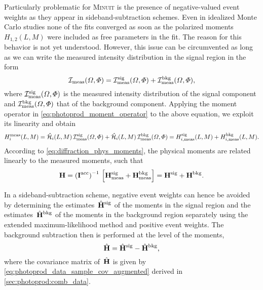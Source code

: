 Particularly problematic for \textsc{Minuit} is the presence of
negative-valued event weights as they appear in sideband-subtraction
schemes.  Even in idealized Monte Carlo studies none of the fits
converged as soon as the polarized moments $H_{1,2}(L, M)$ were
included as free parameters in the fit.  The reason for this behavior
is not yet understood.  However, this issue can be circumvented as
long as we can write the measured intensity distribution in the signal
region in the form
\begin{equation}
  \mathcal{I}_\text{meas}(\Omega, \Phi)
  = \mathcal{I}_\text{meas}^\text{sig}(\Omega, \Phi) + \mathcal{I}_\text{meas}^\text{bkg}(\Omega, \Phi),
\end{equation}
where $\mathcal{I}_\text{meas}^\text{sig}(\Omega, \Phi)$ is the
measured intensity distribution of the signal component and
$\mathcal{I}_\text{meas}^\text{bkg}(\Omega, \Phi)$ that of the
background component.  Applying the moment operator in
\cref{eq:photoprod_moment_operator} to the above equation, we exploit
its linearity and obtain
\begin{equation}
  H_i^\text{meas}(L, M)
  = \hat{\mathcal{H}}_i(L, M)\, \mathcal{I}_\text{meas}^\text{sig}(\Omega, \Phi)
  + \hat{\mathcal{H}}_i(L, M)\, \mathcal{I}_\text{meas}^\text{bkg}(\Omega, \Phi)
  = H_{i, \text{meas}}^\text{sig}(L, M) + H_{i, \text{meas}}^\text{bkg}(L, M).
\end{equation}
According to \cref{eq:diffraction_phys_moments}, the physical moments
are related linearly to the measured moments, such that
\begin{equation}
  \vect{H }
  = \rBrk[0]{\mat{I}^\text{acc}}^{-1}\, \sBrk{\vect{H}_\text{meas}^\text{sig} + \vect{H}_\text{meas}^\text{bkg}}
  = \vect{H}^\text{sig} + \vect{H}^\text{bkg}.
\end{equation}

In a sideband-subtraction scheme, negative event weights can hence be
avoided by determining the estimates~$\hat{\bm{\mathrm{H}}}^\text{sig}$ of
the moments in the signal region and the
estimates~$\hat{\bm{\mathrm{H}}}^\text{bkg}$ of the moments in the background
region separately using the extended maximum-likelihood method and
positive event weights.  The background subtraction then is performed
at the level of the moments, \ie
\begin{equation}
  \hat{\bm{\mathrm{H}}}
  = \hat{\bm{\mathrm{H}}}^\text{sig} - \hat{\bm{\mathrm{H}}}^\text{bkg},
\end{equation}
where the covariance matrix of~$\hat{\bm{\mathrm{H}}}$ is given by
\cref{eq:photoprod_data_sample_cov_augmented} derived in
\cref{sec:photoprod:comb_data}.


